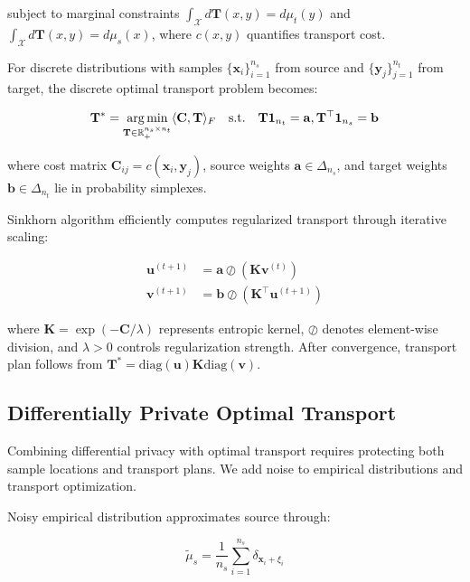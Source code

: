 subject to marginal constraints $\int_{\mathcal{X}} d\mathbf{T}(x, y) = d\mu_t(y)$ and $\int_{\mathcal{X}} d\mathbf{T}(x, y) = d\mu_s(x)$, where $c(x,y)$ quantifies transport cost.

For discrete distributions with samples $\{\mathbf{x}_i\}_{i=1}^{n_s}$ from source and $\{\mathbf{y}_j\}_{j=1}^{n_t}$ from target, the discrete optimal transport problem becomes:

\begin{equation}
\mathbf{T}^* = \operatorname*{arg\,min}_{\mathbf{T} \in \mathbb{R}^{n_s \times n_t}_+} \langle \mathbf{C}, \mathbf{T} \rangle_F \quad \text{s.t.} \quad \mathbf{T}\mathbf{1}_{n_t} = \mathbf{a}, \mathbf{T}^\top\mathbf{1}_{n_s} = \mathbf{b}
\end{equation}

where cost matrix $\mathbf{C}_{ij} = c(\mathbf{x}_i, \mathbf{y}_j)$, source weights $\mathbf{a} \in \Delta_{n_s}$, and target weights $\mathbf{b} \in \Delta_{n_t}$ lie in probability simplexes.

Sinkhorn algorithm efficiently computes regularized transport through iterative scaling:

\begin{align}
\mathbf{u}^{(t+1)} &= \mathbf{a} \oslash (\mathbf{K}\mathbf{v}^{(t)}) \\
\mathbf{v}^{(t+1)} &= \mathbf{b} \oslash (\mathbf{K}^\top\mathbf{u}^{(t+1)})
\end{align}

where $\mathbf{K} = \exp(-\mathbf{C}/\lambda)$ represents entropic kernel, $\oslash$ denotes element-wise division, and $\lambda > 0$ controls regularization strength. After convergence, transport plan follows from $\mathbf{T}^* = \text{diag}(\mathbf{u}) \mathbf{K} \text{diag}(\mathbf{v})$.

\subsection{Differentially Private Optimal Transport}

Combining differential privacy with optimal transport requires protecting both sample locations and transport plans. We add noise to empirical distributions and transport optimization.

Noisy empirical distribution approximates source through:

\begin{equation}
\tilde{\mu}_s = \frac{1}{n_s} \sum_{i=1}^{n_s} \delta_{\mathbf{x}_i + \xi_i}
\end{equation}

